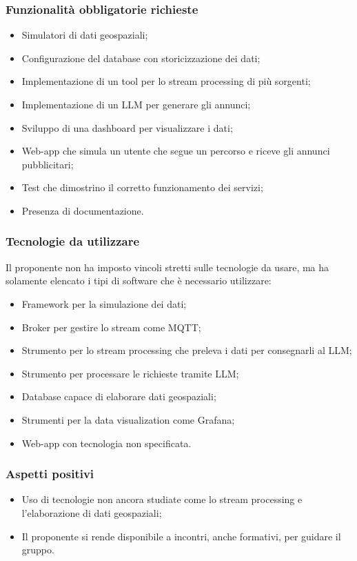 \documentclass[10pt]{article}
\begin{document}
\subsubsection{Funzionalità obbligatorie richieste}
\begin{itemize}
    \item Simulatori di dati geospaziali;
    \item Configurazione del database con storicizzazione dei dati;
    \item Implementazione di un tool per lo stream processing di più sorgenti;
    \item Implementazione di un LLM per generare gli annunci;
    \item Sviluppo di una dashboard per visualizzare i dati;
    \item Web-app che simula un utente che segue un percorso e riceve gli annunci pubblicitari;
    \item Test che dimostrino il corretto funzionamento dei servizi;
    \item Presenza di documentazione.
\end{itemize}
\subsubsection{Tecnologie da utilizzare}
Il proponente non ha imposto vincoli stretti sulle tecnologie da usare, ma ha solamente elencato i tipi di software che è necessario utilizzare:
\begin{itemize}
    \item Framework per la simulazione dei dati;
    \item Broker per gestire lo stream come MQTT;
    \item Strumento per lo stream processing che preleva i dati per consegnarli al LLM;
    \item Strumento per processare le richieste tramite LLM;
    \item Database capace di elaborare dati geospaziali;
    \item Strumenti per la data visualization come Grafana;
    \item Web-app con tecnologia non specificata.
\end{itemize}
\subsubsection{Aspetti positivi}
\begin{itemize}
    \item Uso di tecnologie non ancora studiate come lo stream processing e l’elaborazione di dati geospaziali;
    \item Il proponente si rende disponibile a incontri, anche formativi, per guidare il gruppo.
\end{itemize}
\end{document}
